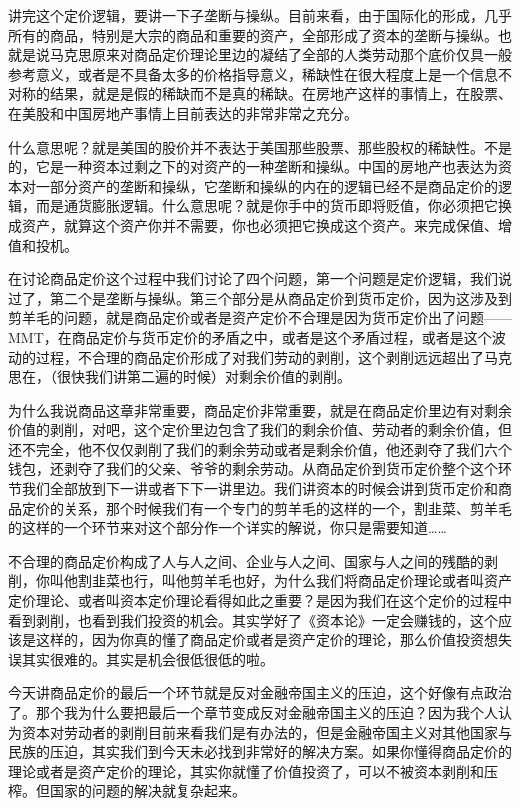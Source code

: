 \documentclass[UTF8, 12pt, a4paper]{ctexrep}
\begin{document}
讲完这个定价逻辑，要讲一下子垄断与操纵。目前来看，由于国际化的形成，几乎所有的商品，特别是大宗的商品和重要的资产，全部形成了资本的垄断与操纵。也就是说马克思原来对商品定价理论里边的凝结了全部的人类劳动那个底价仅具一般参考意义，或者是不具备太多的价格指导意义，稀缺性在很大程度上是一个信息不对称的结果，就是是假的稀缺而不是真的稀缺。在房地产这样的事情上，在股票、在美股和中国房地产事情上目前表达的非常非常之充分。

什么意思呢？就是美国的股价并不表达于美国那些股票、那些股权的稀缺性。不是的，它是一种资本过剩之下的对资产的一种垄断和操纵。中国的房地产也表达为资本对一部分资产的垄断和操纵，它垄断和操纵的内在的逻辑已经不是商品定价的逻辑，而是通货膨胀逻辑。什么意思呢？就是你手中的货币即将贬值，你必须把它换成资产，就算这个资产你并不需要，你也必须把它换成这个资产。来完成保值、增值和投机。

在讨论商品定价这个过程中我们讨论了四个问题，第一个问题是定价逻辑，我们说过了，第二个是垄断与操纵。第三个部分是从商品定价到货币定价，因为这涉及到剪羊毛的问题，就是商品定价或者是资产定价不合理是因为货币定价出了问题——MMT，在商品定价与货币定价的矛盾之中，或者是这个矛盾过程，或者是这个波动的过程，不合理的商品定价形成了对我们劳动的剥削，这个剥削远远超出了马克思在，（很快我们讲第二遍的时候）对剩余价值的剥削。

为什么我说商品这章非常重要，商品定价非常重要，就是在商品定价里边有对剩余价值的剥削，对吧，这个定价里边包含了我们的剩余价值、劳动者的剩余价值，但还不完全，他不仅仅剥削了我们的剩余劳动或者是剩余价值，他还剥夺了我们六个钱包，还剥夺了我们的父亲、爷爷的剩余劳动。从商品定价到货币定价整个这个环节我们全部放到下一讲或者下下一讲里边。我们讲资本的时候会讲到货币定价和商品定价的关系，那个时候我们有一个专门的剪羊毛的这样的一个，割韭菜、剪羊毛的这样的一个环节来对这个部分作一个详实的解说，你只是需要知道……

不合理的商品定价构成了人与人之间、企业与人之间、国家与人之间的残酷的剥削，你叫他割韭菜也行，叫他剪羊毛也好，为什么我们将商品定价理论或者叫资产定价理论、或者叫资本定价理论看得如此之重要？是因为我们在这个定价的过程中看到剥削，也看到我们投资的机会。其实学好了《资本论》一定会赚钱的，这个应该是这样的，因为你真的懂了商品定价或者是资产定价的理论，那么价值投资想失误其实很难的。其实是机会很低很低的啦。

今天讲商品定价的最后一个环节就是反对金融帝国主义的压迫，这个好像有点政治了。那个我为什么要把最后一个章节变成反对金融帝国主义的压迫？因为我个人认为资本对劳动者的剥削目前来看我们是有办法的，但是金融帝国主义对其他国家与民族的压迫，其实我们到今天未必找到非常好的解决方案。如果你懂得商品定价的理论或者是资产定价的理论，其实你就懂了价值投资了，可以不被资本剥削和压榨。但国家的问题的解决就复杂起来。
\end{document}
